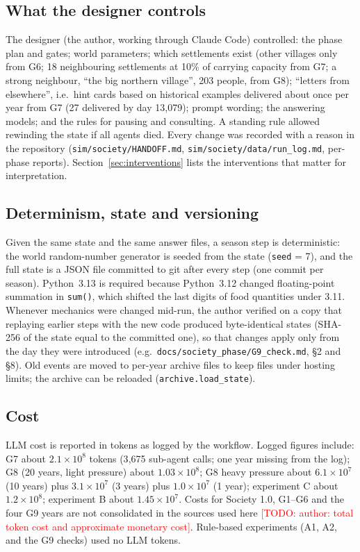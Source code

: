 \documentclass[11pt]{article}
\newcommand{\todo}[1]{\textcolor{red}{[TODO: #1]}}
\begin{document}
\subsection{What the designer controls}
The designer (the author, working through Claude Code) controlled: the phase plan and gates; world parameters; which settlements exist (other villages only from G6; 18 neighbouring settlements at 10\% of carrying capacity from G7; a strong neighbour, ``the big northern village'', 203 people, from G8); ``letters from elsewhere'', i.e.\ hint cards based on historical examples delivered about once per year from G7 (27 delivered by day 13{,}079); prompt wording; the answering models; and the rules for pausing and consulting. A standing rule allowed rewinding the state if all agents died. Every change was recorded with a reason in the repository (\texttt{sim/society/HANDOFF.md}, \texttt{sim/society/data/run\_log.md}, per-phase reports). Section~\ref{sec:interventions} lists the interventions that matter for interpretation.

\subsection{Determinism, state and versioning}
Given the same state and the same answer files, a season step is deterministic: the world random-number generator is seeded from the state (\texttt{seed} = 7), and the full state is a JSON file committed to git after every step (one commit per season). Python~3.13 is required because Python~3.12 changed floating-point summation in \texttt{sum()}, which shifted the last digits of food quantities under 3.11. Whenever mechanics were changed mid-run, the author verified on a copy that replaying earlier steps with the new code produced byte-identical states (SHA-256 of the state equal to the committed one), so that changes apply only from the day they were introduced (e.g.\ \texttt{docs/society\_phase/G9\_check.md}, \S2 and \S8). Old events are moved to per-year archive files to keep files under hosting limits; the archive can be reloaded (\texttt{archive.load\_state}).

\subsection{Cost}
LLM cost is reported in tokens as logged by the workflow. Logged figures include: G7 about $2.1\times10^8$ tokens (3{,}675 sub-agent calls; one year missing from the log); G8 (20 years, light pressure) about $1.03\times10^8$; G8 heavy pressure about $6.1\times10^7$ (10 years) plus $3.1\times10^7$ (3 years) plus $1.0\times10^7$ (1 year); experiment C about $1.2\times10^8$; experiment B about $1.45\times10^7$. Costs for Society 1.0, G1--G6 and the four G9 years are not consolidated in the sources used here \todo{author: total token cost and approximate monetary cost}. Rule-based experiments (A1, A2, and the G9 checks) used no LLM tokens.
\end{document}
